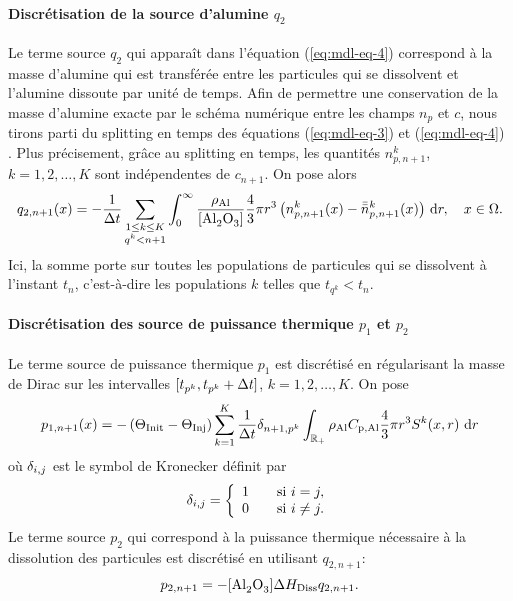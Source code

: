 \paragraph{Discrétisation de la source d'alumine $q_{2}$}
Le terme source $q_{2}$ qui apparaît dans l'équation
(\ref{eq:mdl-eq-4}) correspond à la masse d'alumine qui est transférée
entre les particules qui se dissolvent et l'alumine dissoute par unité
de temps. Afin de permettre une conservation de la masse d'alumine
exacte par le schéma numérique entre les champs $n_p$ et $c$, nous
tirons parti du splitting en temps des équations (\ref{eq:mdl-eq-3})
et (\ref{eq:mdl-eq-4}) \cite{Hofer2011}. Plus précisement, grâce au
splitting en temps, les quantités $n_{p,n+1}^k$, $k = 1, 2, \dots, K$
sont indépendentes de $c_{n+1}$. On pose alors
\begin{equation}\label{eq:q2}
  q_{2,n+1}(x) = -\frac{1}{\dt} \sum_{\substack{1\leq k\leq K\\ q^k < n+1}}
  \int_{0}^\infty
  \frac{\aluminadensity}{[\ce{Al2O3}]} \frac{4}{3}\pi r^3
  \parent{n_{p,n+1}^k(x) - \bar{\bar n}_{p,n+1}^k(x)} \intd{r}, \quad x\in\Omega.
\end{equation}
Ici, la somme porte sur toutes les populations de particules qui se
dissolvent à l'instant $t_n$, c'est-à-dire les populations $k$
telles que $t_{q^k} < t_n$.


\paragraph{Discrétisation des source de puissance thermique $p_1$ et
$p_2$} Le terme source de puissance thermique $p_1$ est discrétisé
en régularisant la masse de Dirac sur les intervalles $[t_{p^k},
  t_{p^k} + \Delta t]$, $k = 1, 2, \dots, K$. On pose
\begin{equation}\label{eq:p1-discret}
p_{1,n+1}(x) = -\left( \Theta_\text{Init} - \Theta_\text{Inj} \right)\sum_{k = 1}^K
\frac{1}{\Delta t}\delta_{n+1,p^k}\int_{\mathbb R_+} \rho_\mathrm{Al}C_{\mathrm{p,Al}}
\frac{4}{3}\pi r^3S^k(x, r)\,\,\mathrm dr
\end{equation}
où $\delta_{i,j}$ est le symbol de Kronecker définit par
\begin{equation}
  \delta_{i,j} = \left\{
  \begin{array}{ll}
    1&\quad\text{si } i = j,\\
    0&\quad\text{si } i\neq j.
  \end{array}\right.
\end{equation}
Le terme source $p_2$ qui correspond à la puissance thermique
nécessaire à la dissolution des particules est discrétisé en
utilisant $q_{2,n+1}$:
\begin{equation}\label{eq:p2-discret}
p_{2,n+1} = -[\cee{Al2O3}]\aluminadissolutionenthalpy q_{2,n+1}.
\end{equation}

